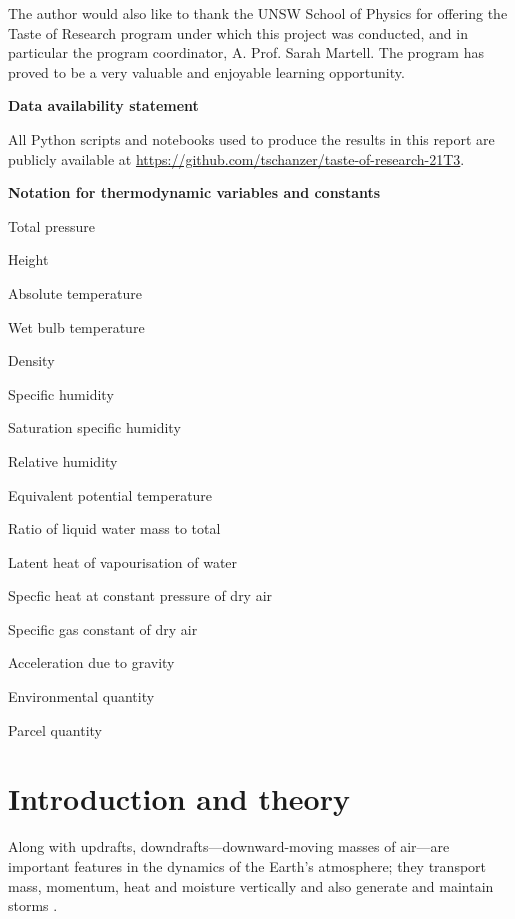 \documentclass[12pt,titlepage]{article}
\begin{document}
The author would also like to thank the UNSW School of Physics for
offering the Taste of Research program under which this project was
conducted, and in particular the program coordinator, A. Prof. Sarah
Martell. The program has proved to be a very valuable and enjoyable
learning opportunity.

\begin{center}
	\large
	\textbf{Data availability statement}
\end{center}
All Python scripts and notebooks used to produce the results in this
report are publicly available at
\url{https://github.com/tschanzer/taste-of-research-21T3}.

\begin{center}
	\large
	\textbf{Notation for thermodynamic variables and constants}
\end{center}
\begin{description}[align=right,labelwidth=2cm,itemsep=0mm]
	\item[$p$] Total pressure
	\item[$z$] Height
	\item[$T$] Absolute temperature
	\item[$T_W$] Wet bulb temperature
	\item[$\rho$] Density
	\item[$q$] Specific humidity
	\item[$q^*(p,T)$] Saturation specific humidity
	\item[$\mathrm{RH}$] Relative humidity
	\item[$\theta_e(p,T,q)$] Equivalent potential temperature
	\item[$l$] Ratio of liquid water mass to total
	\item[$L_v$] Latent heat of vapourisation of water
	\item[$c_p$] Specfic heat at constant pressure of dry air
	\item[R] Specific gas constant of dry air
	\item[$g$] Acceleration due to gravity
	\item[$(\cdot)_E$] Environmental quantity
	\item[$(\cdot)_P$] Parcel quantity
\end{description}

\tableofcontents

\clearpage
\section{Introduction and theory}
Along with updrafts, downdrafts---downward-moving masses of air---are
important features in the dynamics of the Earth's atmosphere;
they transport mass, momentum, heat and moisture vertically
and also generate and maintain storms \parencite{knupp_cotton_1985}.
\end{document}
